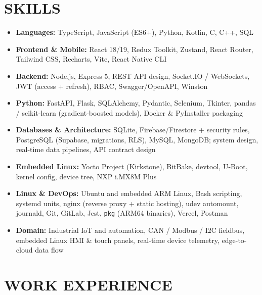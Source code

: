 \documentclass[a4paper,10pt]{article}
\begin{document}
\section{SKILLS}
\begin{itemize}
  \item \textbf{Languages:} TypeScript, JavaScript (ES6+), Python, Kotlin, C, C++, SQL
  \item \textbf{Frontend \& Mobile:} React 18/19, Redux Toolkit, Zustand, React Router, Tailwind CSS, Recharts, Vite, React Native CLI
  \item \textbf{Backend:} Node.js, Express 5, REST API design, Socket.IO / WebSockets, JWT (access + refresh), RBAC, Swagger/OpenAPI, Winston
  \item \textbf{Python:} FastAPI, Flask, SQLAlchemy, Pydantic, Selenium, Tkinter, pandas / scikit-learn (gradient-boosted models), Docker \& PyInstaller packaging
  \item \textbf{Databases \& Architecture:} SQLite, Firebase/Firestore + security rules, PostgreSQL (Supabase, migrations, RLS), MySQL, MongoDB; system design, real-time data pipelines, API contract design
  \item \textbf{Embedded Linux:} Yocto Project (Kirkstone), BitBake, devtool, U-Boot, kernel config, device tree, NXP i.MX8M Plus
  \item \textbf{Linux \& DevOps:} Ubuntu and embedded ARM Linux, Bash scripting, systemd units, nginx (reverse proxy + static hosting), udev automount, journald, Git, GitLab, Jest, \texttt{pkg} (ARM64 binaries), Vercel, Postman
  \item \textbf{Domain:} Industrial IoT and automation, CAN / Modbus / I2C fieldbus, embedded Linux HMI \& touch panels, real-time device telemetry, edge-to-cloud data flow
\end{itemize}

\section{WORK EXPERIENCE}
\end{document}
